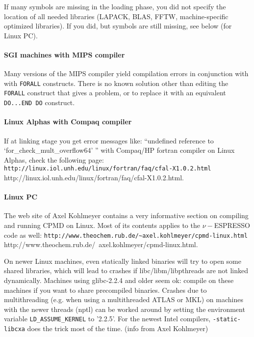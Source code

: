 \documentclass[12pt,a4paper]{article}
\begin{document}
If many symbols are missing in the loading phase, you did not specify
the location of all needed libraries (LAPACK, BLAS, FFTW,
machine-specific optimized libraries).  If you did, but symbols are
still missing, see below (for Linux PC).

\paragraph{SGI machines with MIPS compiler}

Many versions of the MIPS compiler yield compilation errors in
conjunction with with \texttt{FORALL} constructs. There is no
known solution other than editing the \texttt{FORALL} construct
that gives a problem, or to replace it with an equivalent 
\texttt{DO...END DO} construct.

\paragraph{Linux Alphas with Compaq compiler}

If at linking stage you get error messages like: ``undefined reference
to `for\_check\_mult\_overflow64' '' with Compaq/HP fortran compiler
on Linux Alphas, check the following page:
\htmladdnormallink%
{\texttt{http://linux.iol.unh.edu/linux/fortran/faq/cfal-X1.0.2.html}}%
{http://linux.iol.unh.edu/linux/fortran/faq/cfal-X1.0.2.html}.

\paragraph{Linux PC}

The web site of Axel Kohlmeyer contains a very informative section 
on compiling and running CPMD on Linux.
Most of its contents applies to the $\nu-$ESPRESSO code as well:\hfill\break
\htmladdnormallink%
{\texttt{http://www.theochem.rub.de/\~{}axel.kohlmeyer/cpmd-linux.html}}%
{http://www.theochem.rub.de/~axel.kohlmeyer/cpmd-linux.html}.

On newer Linux machines, even statically linked binaries will try 
to open some shared libraries, which will lead to crashes
if libc/libm/libpthreads are not linked dynamically. Machines 
using glibc-2.2.4 and older seem ok: compile on these machines
if you want to share precompiled binaries. Crashes due to multithreading 
(e.g. when using a multithreaded ATLAS or MKL) on machines with 
the newer threads (nptl) can be worked around by setting the 
environment variable \texttt{LD\_ASSUME\_KERNEL} to '2.2.5'. For 
the newest Intel compilers, \texttt{-static-libcxa} does the 
trick most of the time. (info from Axel Kohlmeyer)
\end{document}
